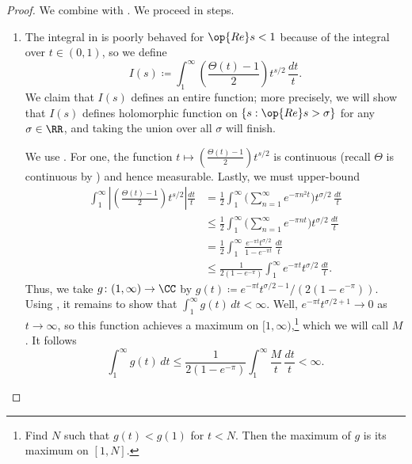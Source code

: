 \documentclass[../notes.tex]{subfiles}
\begin{document}
\begin{proof}
	We combine  with . We proceed in steps.
	\begin{enumerate}
		\item The integral in  is poorly behaved for $\op{Re}s<1$ because of the integral over $t\in(0,1)$, so we define
		\[I(s)\coloneqq\int_1^\infty\left(\frac{\Theta(t)-1}2\right)t^{s/2}\,\frac{dt}t.\]
		We claim that $I(s)$ defines an entire function; more precisely, we will show that $I(s)$ defines holomorphic function on $\{s:\op{Re}s>\sigma\}$ for any $\sigma\in\RR$, and taking the union over all $\sigma$ will finish.
		
		We use . For one, the function $t\mapsto\left(\frac{\Theta(t)-1}2\right)t^{s/2}$ is continuous (recall $\Theta$ is continuous by ) and hence measurable. Lastly, we must upper-bound
		\begin{align*}
			\int_1^\infty\left|\left(\frac{\Theta(t)-1}2\right)t^{s/2}\right|\frac{dt}t &= \frac12\int_1^\infty\Bigg(\sum_{n=1}^\infty e^{-\pi n^2t}\Bigg)t^{\sigma/2}\,\frac{dt}t \\
			&\le \frac12\int_1^\infty\Bigg(\sum_{n=1}^\infty e^{-\pi nt}\Bigg)t^{\sigma/2}\,\frac{dt}t \\
			&= \frac12\int_1^\infty\frac{e^{-\pi t}t^{\sigma/2}}{1-e^{-\pi t}}\,\frac{dt}t \\
			&\le \frac1{2\left(1-e^{-\pi}\right)}\int_1^\infty e^{-\pi t}t^{\sigma/2}\,\frac{dt}t.
		\end{align*}
		Thus, we take $g\colon(1,\infty)\to\CC$ by $g(t)\coloneqq e^{-\pi t}t^{\sigma/2-1}/\left(2\left(1-e^{-\pi}\right)\right)$. Using , it remains to show that $\int_1^\infty g(t)\,dt<\infty$. Well, $e^{-\pi t}t^{\sigma/2+1}\to0$ as $t\to\infty$, so this function achieves a maximum on $[1,\infty)$,\footnote{Find $N$ such that $g(t)<g(1)$ for $t<N$. Then the maximum of $g$ is its maximum on $[1,N]$.} which we will call $M$. It follows
		\[\int_1^\infty g(t)\,dt\le\frac1{2\left(1-e^{-\pi}\right)}\int_1^\infty\frac Mt\,\frac{dt}t<\infty.\]
	

\end{enumerate}
\end{proof}
\end{document}
